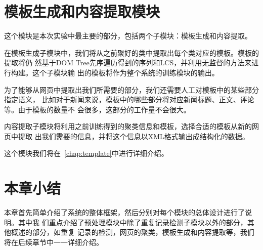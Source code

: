 \section{模板生成和内容提取模块}
\label{sec:templateintro}
这个模块是本次实验中最主要的部分，包括两个子模块：模板生成和内容提取。

在模板生成子模块中，我们将从之前聚好的类中提取出每个类对应的模板。模板的提取将仍
然基于DOM Tree先序遍历得到的序列和LCS，并利用无监督的方法来进行构建。这个子模块输
出的模板将作为整个系统的训练模块的输出。

为了能够从网页中提取出我们所需要的部分，我们还需要人工对模板中的某些部分指定语义，
比如对于新闻来说，模板中的哪些部分将对应新闻标题、正文、评论等。由于模板的数量不
会很多，这部分的工作量不会很大。

内容提取子模块将利用之前训练得到的聚类信息和模板，选择合适的模板从新的网页中提取
出我们需要的信息，并将这个信息以XML格式输出成结构化的数据。

这个模块我们将在~\ref{chap:template}中进行详细介绍。
\section{本章小结}
\label{sec:summaryframework}
本章首先简单介绍了系统的整体框架，然后分别对每个模块的总体设计进行了说明。其中我
们重点介绍了预处理模块中除了重复记录检测子模块以外的部分，其他概述的部分，如重复
记录的检测，网页的聚类，模板生成和内容提取等，我们将在后续章节中一一详细介绍。

